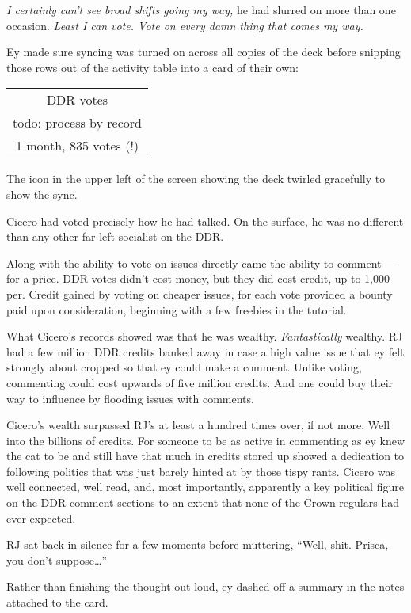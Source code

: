 \emph{I certainly can't see broad shifts going my way,} he had slurred on more than one occasion. \emph{Least I can vote. Vote on every damn thing that comes my way.}

Ey made sure syncing was turned on across all copies of the deck before snipping those rows out of the activity table into a card of their own:

\begin{longtable}[]{@{}c@{}}
\toprule
\endhead
DDR votes\tabularnewline
todo: process by record\tabularnewline
1 month, 835 votes (!)\tabularnewline
\bottomrule
\end{longtable}

The icon in the upper left of the screen showing the deck twirled gracefully to show the sync.

Cicero had voted precisely how he had talked. On the surface, he was no different than any other far-left socialist on the DDR.

Along with the ability to vote on issues directly came the ability to comment — for a price. DDR votes didn't cost money, but they did cost credit, up to 1,000 per. Credit gained by voting on cheaper issues, for each vote provided a bounty paid upon consideration, beginning with a few freebies in the tutorial.

What Cicero's records showed was that he was wealthy. \emph{Fantastically} wealthy. RJ had a few million DDR credits banked away in case a high value issue that ey felt strongly about cropped so that ey could make a comment. Unlike voting, commenting could cost upwards of five million credits. And one could buy their way to influence by flooding issues with comments.

Cicero's wealth surpassed RJ's at least a hundred times over, if not more. Well into the billions of credits. For someone to be as active in commenting as ey knew the cat to be and still have that much in credits stored up showed a dedication to following politics that was just barely hinted at by those tispy rants. Cicero was well connected, well read, and, most importantly, apparently a key political figure on the DDR comment sections to an extent that none of the Crown regulars had ever expected.

RJ sat back in silence for a few moments before muttering, ``Well, shit. Prisca, you don't suppose\ldots{}''

Rather than finishing the thought out loud, ey dashed off a summary in the notes attached to the card.

